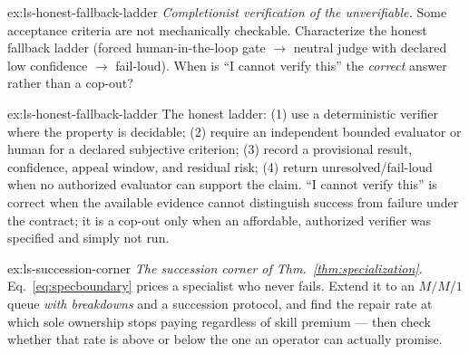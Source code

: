 \documentclass[11pt,a4paper]{article}
\theoremstyle{definition}
\theoremstyle{plain}
\newcounter{protocol}[section]
\begin{document}
\begin{pdexercise}[kind=Open,rating=3]{ex:ls-honest-fallback-ladder}
\emph{Completionist verification of the unverifiable.} Some
acceptance criteria are not mechanically checkable. Characterize the honest fallback
ladder (forced human-in-the-loop gate $\to$ neutral judge with declared low
confidence $\to$ fail-loud). When is ``I cannot verify this'' the \emph{correct}
answer rather than a cop-out?
\end{pdexercise}
\begin{pdsolution}{ex:ls-honest-fallback-ladder}
The honest ladder: (1) use a deterministic verifier where the property is decidable; (2) require an independent bounded evaluator or human for a declared subjective criterion; (3) record a provisional result, confidence, appeal window, and residual risk; (4) return unresolved/fail-loud when no authorized evaluator can support the claim. ``I cannot verify this'' is correct when the available evidence cannot distinguish success from failure under the contract; it is a cop-out only when an affordable, authorized verifier was specified and simply not run.
\end{pdsolution}
\begin{pdexercise}[kind=Open,rating=3]{ex:ls-succession-corner}
\emph{The succession corner of
Thm.~\ref{thm:specialization}.} Eq.~\ref{eq:specboundary} prices a specialist who
never fails. Extend it to an $M/M/1$ queue \emph{with breakdowns} and a succession
protocol, and find the repair rate at which sole ownership stops paying regardless of
skill premium --- then check whether that rate is above or below the one an operator
can actually promise.
\end{pdexercise}
\end{document}
